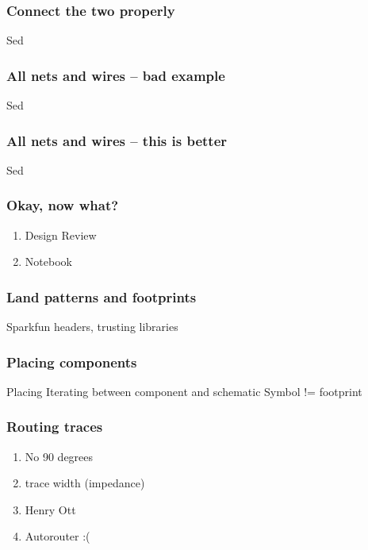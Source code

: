\documentclass{beamer}
\begin{document}

\begin{frame}
\frametitle{Connect the two properly}
Sed 
\end{frame}


\begin{frame}
\frametitle{All nets and wires -- bad example}
Sed 
\end{frame}


\begin{frame}
\frametitle{All nets and wires -- this is better}
Sed 
\end{frame}


\begin{frame}
\frametitle{Okay, now what?}
\begin{enumerate}
\item Design Review
\item Notebook
\end{enumerate}
\end{frame}


\begin{frame}
\frametitle{Land patterns and footprints}
Sparkfun headers, trusting libraries
\end{frame}


\begin{frame}
\frametitle{Placing components}
Placing
Iterating between component and schematic
Symbol != footprint
\end{frame}


\begin{frame}
\frametitle{Routing traces}
\begin{enumerate}
\item No 90 degrees
\item trace width (impedance)
\item Henry Ott
\item Autorouter :(
\end{enumerate}
\end{frame}
\end{document}
